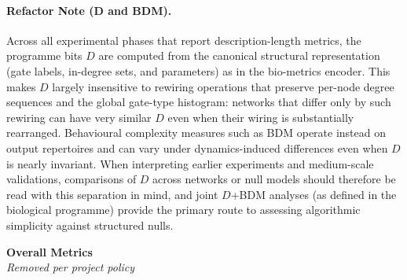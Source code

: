 \documentclass{article}
\begin{document}
\paragraph{Refactor Note (D and BDM).} Across all experimental phases that report description-length metrics, the programme bits \(D\) are computed from the canonical structural representation (gate labels, in-degree sets, and parameters) as in the bio-metrics encoder. This makes \(D\) largely insensitive to rewiring operations that preserve per-node degree sequences and the global gate-type histogram: networks that differ only by such rewiring can have very similar \(D\) even when their wiring is substantially rearranged. Behavioural complexity measures such as BDM operate instead on output repertoires and can vary under dynamics-induced differences even when \(D\) is nearly invariant. When interpreting earlier experiments and medium-scale validations, comparisons of \(D\) across networks or null models should therefore be read with this separation in mind, and joint \(D\)+BDM analyses (as defined in the biological programme) provide the primary route to assessing algorithmic simplicity against structured nulls.\\
\begin{center}
\textbf{Overall Metrics}\\
\emph{Removed per project policy}
\end{center}
\end{document}
